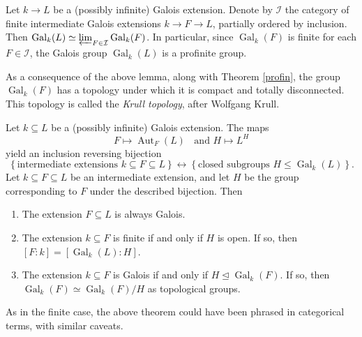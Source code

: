\documentclass[11pt,openany]{book} %
\begin{document}
\begin{lemma}
Let $k \to L$ be a (possibly infinite) Galois extension. Denote by $\mathcal{I}$ the category of finite intermediate Galois extensions $k \to F \to L$, partially ordered by inclusion. Then $\operatorname{Gal}_k(L) \simeq \varprojlim_{F \in \mathcal{I}} \operatorname{Gal}_k(F)$. In particular, since $\operatorname{Gal}_k(F)$ is finite for each $F \in \mathcal{I}$, the Galois group $\operatorname{Gal}_k(L)$ is a profinite group.
\end{lemma}
\hfill

As a consequence of the above lemma, along with Theorem \ref{profin}, the group $\operatorname{Gal}_k(F)$ has a topology under which it is compact and totally disconnected. This topology is called the \emph{Krull topology}, after Wolfgang Krull.\\

\begin{theorem} \label{galinffld}
Let $k \subseteq L$ be a (possibly infinite) Galois extension. The maps
\[
F \mapsto \operatorname{Aut}_F(L) \;\; \text{ and } H \mapsto L^H
\]
yield an inclusion reversing bijection
\[
\left\lbrace \text{intermediate extensions } k \subseteq F \subseteq L \right\rbrace \longleftrightarrow \left\lbrace \text{closed subgroups } H \leq \operatorname{Gal}_k(L) \right\rbrace.
\]
Let $k \subseteq F \subseteq L$ be an intermediate extension, and let $H$ be the group corresponding to $F$ under the described bijection. Then
\begin{enumerate}
	\item The extension $F \subseteq L$ is always Galois.
	\item The extension $k \subseteq F$ is finite if and only if $H$ is open. If so, then $[F : k] = [\operatorname{Gal}_k(L) : H]$.
    \item The extension $k \subseteq F$ is Galois if and only if $H \trianglelefteq \operatorname{Gal}_k(F)$. If so, then $\operatorname{Gal}_k(F) \simeq \operatorname{Gal}_k(F)/H$ as topological groups.
\end{enumerate}
\end{theorem}

\begin{remark}
As in the finite case, the above theorem could have been phrased in categorical terms, with similar caveats.
\end{remark}
\end{document}
